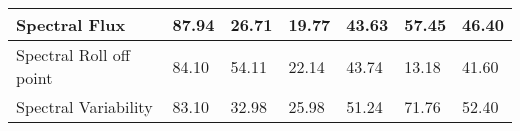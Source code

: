 \begin{table}[h!]
\begin{center}
\begin{tabular}{|l|l|l|l|l|l|l|}
                        \hline Spectral Flux&

                        87.94
                        &
                        26.71
                        &
                        19.77
                        &
                        43.63
                        &
                        57.45
                        &
                        46.40
                        \\

                        \hline Spectral Roll off point&

                        84.10
                        &
                        54.11
                        &
                        22.14
                        &
                        43.74
                        &
                        13.18
                        &
                        41.60
                        \\

                        \hline Spectral Variability&

                        83.10
                        &
                        32.98
                        &
                        25.98
                        &
                        51.24
                        &
                        71.76
                        &
                        52.40
                        \\\hline

                \end{tabular}
        \end{center}
\end{table}

